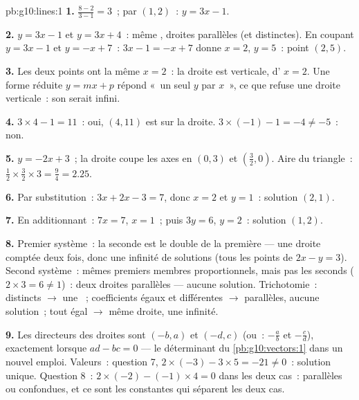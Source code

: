 \begin{solution}{pb:g10:lines:1}
\textbf{1.}  $\frac{8 - 2}{3 - 1} = 3$~; par
$(1, 2)$~: $y = 3x - 1$.

\textbf{2.} $y = 3x - 1$ et $y = 3x + 4$~: même , droites parallèles (et distinctes). En coupant
$y = 3x - 1$ et $y = -x + 7$~: $3x - 1 = -x + 7$ donne $x = 2$,
$y = 5$~: point $(2, 5)$.

\textbf{3.} Les deux points ont la même  $x = 2$~: la droite
est verticale, d' $x = 2$. Une forme réduite $y = mx + p$
répond «~un seul $y$ par $x$~», ce que refuse une droite verticale~:
son  serait infini.

\textbf{4.} $3 \times 4 - 1 = 11$~: oui, $(4, 11)$ est sur la
droite. $3 \times (-1) - 1 = -4 \neq -5$~: non.

\textbf{5.} $y = -2x + 3$~; la droite coupe les axes en $(0, 3)$ et
$\left(\frac32, 0\right)$. Aire du triangle~:
$\frac12 \times \frac32 \times 3 = \frac94 = 2.25$.

\textbf{6.} Par substitution~: $3x + 2x - 3 = 7$, donc $x = 2$ et
$y = 1$~: solution $(2, 1)$.

\textbf{7.} En additionnant~: $7x = 7$, $x = 1$~; puis $3y = 6$,
$y = 2$~: solution $(1, 2)$.

\textbf{8.} Premier système~: la seconde  est le double de la
première --- une droite comptée deux fois, donc une infinité de
solutions (tous les points de $2x - y = 3$). Second système~: mêmes
premiers membres proportionnels, mais pas les seconds
($2 \times 3 = 6 \neq 1$)~: deux droites parallèles --- aucune
solution. Trichotomie~:  distincts $\to$ une
~; coefficients égaux et 
différentes $\to$ parallèles, aucune solution~; tout égal $\to$ même
droite, une infinité.

\textbf{9.} Les  directeurs des droites sont $(-b, a)$ et
$(-d, c)$ (ou~:  $-\frac ab$ et $-\frac cd$),
 exactement lorsque $ad - bc = 0$ --- le déterminant du
\cref{pb:g10:vectors:1} dans un nouvel emploi. Valeurs~: question 7,
$2 \times (-3) - 3 \times 5 = -21 \neq 0$~: solution unique.
Question 8~: $2 \times (-2) - (-1) \times 4 = 0$ dans les deux cas~:
parallèles ou confondues, et ce sont les constantes qui séparent les
deux cas.


\end{solution}
